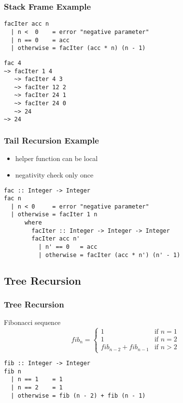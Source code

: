 \documentclass[dvipsnames]{beamer}
\theoremstyle{plain}
\begin{document}
\begin{frame}[fragile]
  \frametitle{Stack Frame Example}

  \begin{exampleblock}{}
  \begin{lstlisting}
facIter acc n
  | n <  0    = error "negative parameter"
  | n == 0    = acc
  | otherwise = facIter (acc * n) (n - 1)
  \end{lstlisting}

    \begin{lstlisting}[frame=single]
fac 4
~> facIter 1 4
   ~> facIter 4 3
   ~> facIter 12 2
   ~> facIter 24 1
   ~> facIter 24 0
   ~> 24
~> 24
    \end{lstlisting}
  \end{exampleblock}
\end{frame}

\begin{frame}[fragile]
  \frametitle{Tail Recursion Example}

  \begin{itemize}
    \item helper function can be local
    \item negativity check only once
  \end{itemize}

  \begin{lstlisting}
fac :: Integer -> Integer
fac n
  | n < 0     = error "negative parameter"
  | otherwise = facIter 1 n
      where
        facIter :: Integer -> Integer -> Integer
        facIter acc n'
          | n' == 0   = acc
          | otherwise = facIter (acc * n') (n' - 1)
  \end{lstlisting}
\end{frame}

\subsection{Tree Recursion}

\begin{frame}[fragile]
  \frametitle{Tree Recursion}

  \begin{exampleblock}{Fibonacci sequence}
    \[
      fib_n =
        \begin{cases}
          1                     & \mbox{if } n = 1\\
          1                     & \mbox{if } n = 2\\
          fib_{n-2} + fib_{n-1} & \mbox{if } n > 2
        \end{cases}
    \]

    \begin{lstlisting}
fib :: Integer -> Integer
fib n
  | n == 1    = 1
  | n == 2    = 1
  | otherwise = fib (n - 2) + fib (n - 1)
    \end{lstlisting}
  \end{exampleblock}
\end{frame}
\end{document}
